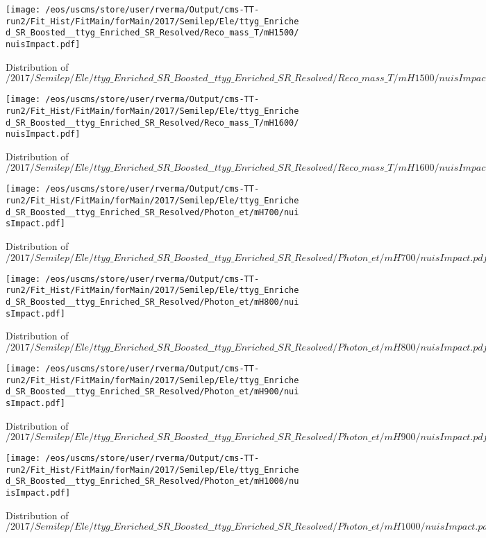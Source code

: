 \begin{figure}
\centering
\texttt{[image: /eos/uscms/store/user/rverma/Output/cms-TT-run2/Fit\_Hist/FitMain/forMain/2017/Semilep/Ele/ttyg\_Enriched\_SR\_Boosted\_\_ttyg\_Enriched\_SR\_Resolved/Reco\_mass\_T/mH1500/nuisImpact.pdf]}
\caption{Distribution of $/2017/Semilep/Ele/ttyg\_Enriched\_SR\_Boosted\_\_ttyg\_Enriched\_SR\_Resolved/Reco\_mass\_T/mH1500/nuisImpact.pdf$}
\end{figure}

\begin{figure}
\centering
\texttt{[image: /eos/uscms/store/user/rverma/Output/cms-TT-run2/Fit\_Hist/FitMain/forMain/2017/Semilep/Ele/ttyg\_Enriched\_SR\_Boosted\_\_ttyg\_Enriched\_SR\_Resolved/Reco\_mass\_T/mH1600/nuisImpact.pdf]}
\caption{Distribution of $/2017/Semilep/Ele/ttyg\_Enriched\_SR\_Boosted\_\_ttyg\_Enriched\_SR\_Resolved/Reco\_mass\_T/mH1600/nuisImpact.pdf$}
\end{figure}

\begin{figure}
\centering
\texttt{[image: /eos/uscms/store/user/rverma/Output/cms-TT-run2/Fit\_Hist/FitMain/forMain/2017/Semilep/Ele/ttyg\_Enriched\_SR\_Boosted\_\_ttyg\_Enriched\_SR\_Resolved/Photon\_et/mH700/nuisImpact.pdf]}
\caption{Distribution of $/2017/Semilep/Ele/ttyg\_Enriched\_SR\_Boosted\_\_ttyg\_Enriched\_SR\_Resolved/Photon\_et/mH700/nuisImpact.pdf$}
\end{figure}

\begin{figure}
\centering
\texttt{[image: /eos/uscms/store/user/rverma/Output/cms-TT-run2/Fit\_Hist/FitMain/forMain/2017/Semilep/Ele/ttyg\_Enriched\_SR\_Boosted\_\_ttyg\_Enriched\_SR\_Resolved/Photon\_et/mH800/nuisImpact.pdf]}
\caption{Distribution of $/2017/Semilep/Ele/ttyg\_Enriched\_SR\_Boosted\_\_ttyg\_Enriched\_SR\_Resolved/Photon\_et/mH800/nuisImpact.pdf$}
\end{figure}

\begin{figure}
\centering
\texttt{[image: /eos/uscms/store/user/rverma/Output/cms-TT-run2/Fit\_Hist/FitMain/forMain/2017/Semilep/Ele/ttyg\_Enriched\_SR\_Boosted\_\_ttyg\_Enriched\_SR\_Resolved/Photon\_et/mH900/nuisImpact.pdf]}
\caption{Distribution of $/2017/Semilep/Ele/ttyg\_Enriched\_SR\_Boosted\_\_ttyg\_Enriched\_SR\_Resolved/Photon\_et/mH900/nuisImpact.pdf$}
\end{figure}

\begin{figure}
\centering
\texttt{[image: /eos/uscms/store/user/rverma/Output/cms-TT-run2/Fit\_Hist/FitMain/forMain/2017/Semilep/Ele/ttyg\_Enriched\_SR\_Boosted\_\_ttyg\_Enriched\_SR\_Resolved/Photon\_et/mH1000/nuisImpact.pdf]}
\caption{Distribution of $/2017/Semilep/Ele/ttyg\_Enriched\_SR\_Boosted\_\_ttyg\_Enriched\_SR\_Resolved/Photon\_et/mH1000/nuisImpact.pdf$}
\end{figure}

